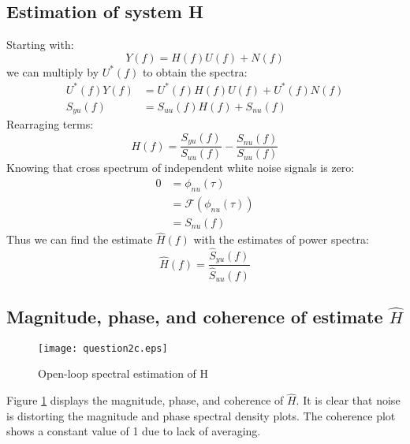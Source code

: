 \documentclass[11pt,a4paper]{article}
\begin{document}
\subsection{Estimation of system H}
Starting with:
\begin{equation*}
    Y(f) = H(f)U(f) + N(f)
\end{equation*}
we can multiply by $U^*(f)$ to obtain the spectra:
\begin{align*}
    U^*(f)Y(f) &= U^*(f)H(f)U(f) + U^*(f)N(f) \\
    S_{yu}(f) &= S_{uu}(f)H(f) + S_{nu}(f)
\end{align*}
Rearraging terms:
\begin{equation}
    H(f) = \frac{S_{yu}(f)}{S_{uu}(f)}  - \frac{S_{nu}(f)}{S_{uu}(f)}
    \label{eq:H}
\end{equation}
Knowing that cross spectrum of independent white noise signals is zero:
\begin{align*}
    0 &= \phi_{nu}(\tau) \\
      &= \mathcal{F}(\phi_{nu}(\tau)) \\
      &= S_{nu}(f)
\end{align*}
Thus we can find the estimate $\hat{H}(f)$ with the estimates of power spectra:
\begin{equation}
    \hat{H}(f) = \frac{\hat{S}_{yu}(f)}{\hat{S}_{uu}(f)}
    \label{eq:H_est}
\end{equation}

\subsection{Magnitude, phase, and coherence of estimate $\hat{H}$}
\begin{figure}
    \begin{center}
        \texttt{[image: question2c.eps]}
    \end{center}
    \caption{Open-loop spectral estimation of H}
    \label{fig:2c}
\end{figure}
Figure \ref{fig:2c} displays the magnitude, phase, and coherence of $\hat{H}$.
It is clear that noise is distorting the magnitude and phase spectral density
plots. The coherence plot shows a constant value of 1 due to lack of averaging.

\end{document}
